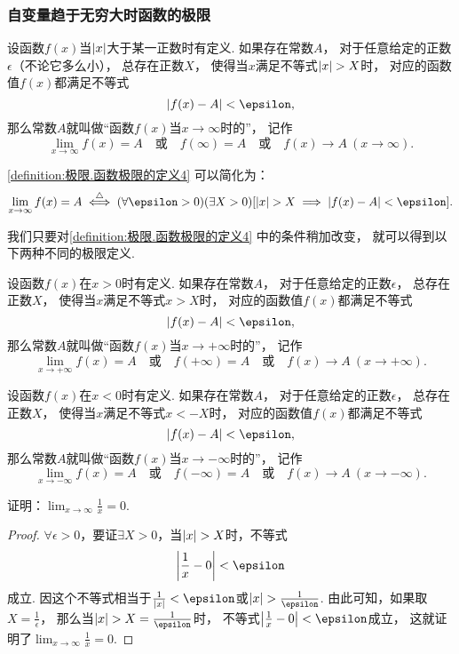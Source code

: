 \subsubsection*{自变量趋于无穷大时函数的极限}
\begin{definition}\label{definition:极限.函数极限的定义4}
设函数\(f(x)\)当\(\abs{x}\)大于某一正数时有定义.
如果存在常数\(A\)，
对于任意给定的正数\(\epsilon\)（不论它多么小），
总存在正数\(X\)，
使得当\(x\)满足不等式\(\abs{x} > X\)时，
对应的函数值\(f(x)\)都满足不等式\[
\abs{f(x) - A} < \epsilon,
\]那么常数\(A\)就叫做“函数\(f(x)\)当\(x \to \infty\)时的”，
记作\[
\lim_{x \to \infty} f(x) = A
\quad\text{或}\quad
f(\infty) = A
\quad\text{或}\quad
f(x) \to A\ (x \to \infty).
\]
\end{definition}
\cref{definition:极限.函数极限的定义4} 可以简化为：
\[
	\lim_{x\to\infty} f(x) = A
	\defiff
	(\forall\epsilon>0)
	(\exists X>0)
	[
		\abs{x} > X
		\implies
		\abs{f(x) - A} < \epsilon
	].
\]

我们只要对\cref{definition:极限.函数极限的定义4} 中的条件稍加改变，
就可以得到以下两种不同的极限定义.
\begin{definition}\label{definition:极限.函数极限的定义5}
设函数\(f(x)\)在\(x > 0\)时有定义.
如果存在常数\(A\)，
对于任意给定的正数\(\epsilon\)，
总存在正数\(X\)，
使得当\(x\)满足不等式\(x > X\)时，
对应的函数值\(f(x)\)都满足不等式\[
	\abs{f(x) - A} < \epsilon,
\]
那么常数\(A\)就叫做“函数\(f(x)\)当\(x \to +\infty\)时的”，
记作\[
	\lim_{x \to +\infty} f(x) = A
	\quad\text{或}\quad
	f(+\infty) = A
	\quad\text{或}\quad
	f(x) \to A\ (x \to +\infty).
\]
\end{definition}

\begin{definition}\label{definition:极限.函数极限的定义6}
设函数\(f(x)\)在\(x < 0\)时有定义.
如果存在常数\(A\)，
对于任意给定的正数\(\epsilon\)，
总存在正数\(X\)，
使得当\(x\)满足不等式\(x < -X\)时，
对应的函数值\(f(x)\)都满足不等式\[
\abs{f(x) - A} < \epsilon,
\]那么常数\(A\)就叫做“函数\(f(x)\)当\(x \to -\infty\)时的”，
记作\[
\lim_{x \to -\infty} f(x) = A
\quad\text{或}\quad
f(-\infty) = A
\quad\text{或}\quad
f(x) \to A\ (x \to -\infty).
\]
\end{definition}

\begin{example}
\def\l{\lim_{x\to\infty}}
证明：\(\l \frac{1}{x} = 0\).
\begin{proof}
\(\forall\epsilon>0\)，要证\(\exists X > 0\)，当\(\abs{x}>X\)时，不等式\[
\abs{\frac{1}{x}-0}<\epsilon
\]成立.
因这个不等式相当于\(\frac{1}{\abs{x}}<\epsilon\)或\(\abs{x}>\frac{1}{\epsilon}\).
由此可知，如果取\(X=\frac{1}{\epsilon}\)，
那么当\(\abs{x}>X=\frac{1}{\epsilon}\)时，
不等式\(\abs{\frac{1}{x}-0}<\epsilon\)成立，
这就证明了\(\l \frac{1}{x} = 0\).
\end{proof}
\end{example}

